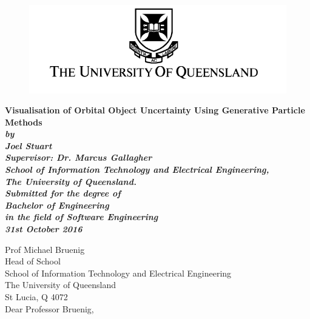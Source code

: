 \documentclass[12pt,openany,a4paper]{book}
\renewcommand{\baselinestretch}{1.2}	%
\begin{document}
	
	\frontmatter
	
	\begin{titlepage}
		\renewcommand{\baselinestretch}{1.0}
		\begin{center}
			\vspace*{15mm}
			\begin{figure}
				\centering
				\includegraphics[scale=0.8]{UQlogo.png}
			\end{figure}

			\Huge\bf
			Visualisation of Orbital Object Uncertainty Using Generative Particle Methods \\
			\vspace{20mm}
			\large \sl
			by\\
			Joel Stuart\\
			Supervisor: Dr. Marcus Gallagher
			\medskip\\

			\rm
			School of Information Technology and Electrical Engineering,\\
			The University of Queensland.\\
			\vspace{30mm}
			Submitted for the degree of\\
			Bachelor of Engineering
			\smallskip\\
			\normalsize
			in the field of Software Engineering
			\medskip\\
			\large
			31st October 2016	
		\end{center}
	\end{titlepage}
	
	\clearpage
	
	\begin{flushleft}
		Prof Michael Bruenig\\
		Head of School\\
		School of Information Technology and Electrical Engineering\\
		The University of Queensland\\
		St Lucia, Q 4072\\
		\bigskip\bigskip
		Dear Professor Bruenig,
	\end{flushleft}
	
\end{document}

